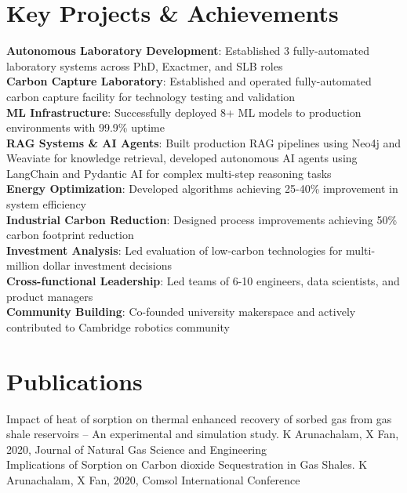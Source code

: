 \documentclass{../templates/karthicv-single}
\begin{document}
\section{Key Projects \& Achievements}
\textbf{Autonomous Laboratory Development}: Established 3 fully-automated laboratory systems across PhD, Exactmer, and SLB roles \\
\textbf{Carbon Capture Laboratory}: Established and operated fully-automated carbon capture facility for technology testing and validation \\
\textbf{ML Infrastructure}: Successfully deployed 8+ ML models to production environments with 99.9\% uptime \\
\textbf{RAG Systems \& AI Agents}: Built production RAG pipelines using Neo4j and Weaviate for knowledge retrieval, developed autonomous AI agents using LangChain and Pydantic AI for complex multi-step reasoning tasks \\
\textbf{Energy Optimization}: Developed algorithms achieving 25-40\% improvement in system efficiency \\
\textbf{Industrial Carbon Reduction}: Designed process improvements achieving 50\% carbon footprint reduction \\
\textbf{Investment Analysis}: Led evaluation of low-carbon technologies for multi-million dollar investment decisions \\
\textbf{Cross-functional Leadership}: Led teams of 6-10 engineers, data scientists, and product managers \\
\textbf{Community Building}: Co-founded university makerspace and actively contributed to Cambridge robotics community

\section{Publications}
Impact of heat of sorption on thermal enhanced recovery of sorbed gas from gas shale reservoirs – An experimental and simulation study. K Arunachalam, X Fan, 2020, Journal of Natural Gas Science and Engineering \\
Implications of Sorption on Carbon dioxide Sequestration in Gas Shales. K Arunachalam, X Fan, 2020, Comsol International Conference
\end{document}
